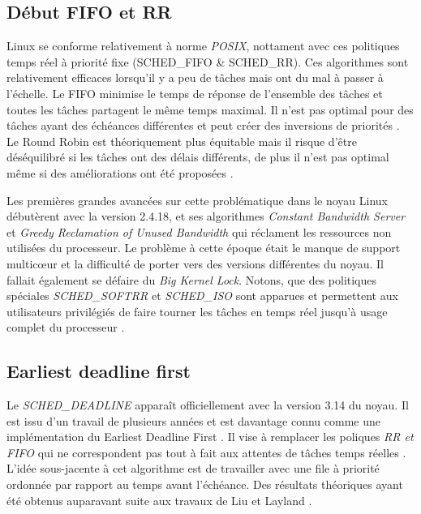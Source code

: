 \documentclass[letterpaper]{article}
\begin{document}
\subsection{Début FIFO et RR}

Linux se conforme relativement à norme \textit{POSIX}, nottament avec ces politiques temps réel à priorité fixe (SCHED\_FIFO \& SCHED\_RR). Ces algorithmes sont relativement efficaces lorsqu'il y a peu de tâches mais ont du mal à passer à l'échelle. Le FIFO minimise le temps de réponse de l'ensemble des tâches et toutes les tâches partagent le même temps maximal. Il n'est pas optimal pour des tâches ayant des échéances différentes et peut créer des inversions de priorités \citep{Klein:1993:PHR:174003}. Le Round Robin est théoriquement plus équitable mais il risque d'être déséquilibré si les tâches ont des délais différents, de plus il n'est pas optimal même si des améliorations ont été proposées \citep{Shreedhar:1995:EFQ:217391.217453}.

Les premières grandes avancées sur cette problématique dans le noyau Linux débutèrent avec la version 2.4.18, et ses algorithmes \textit{Constant Bandwidth Server} \citep{Abeni:1998:IMA:827270.829047} et \textit{Greedy Reclamation of Unused Bandwidth} \citep{Lipari:2000:GRU:1947412.1947445} qui réclament les ressources non utilisées du processeur. Le problème à cette époque était le manque de support multicœur et la difficulté de porter vers des versions différentes du noyau. Il fallait également se défaire du \textit{Big Kernel Lock}. Notons, que des politiques spéciales \textit{SCHED\_SOFTRR} et \textit{SCHED\_ISO} sont apparues et permettent aux utilisateurs privilégiés de faire tourner les tâches en temps réel jusqu'à usage complet du processeur \citep{scordino2006linux}.

\subsection{Earliest deadline first}

Le \textit{SCHED\_DEADLINE} apparaît officiellement avec la version 3.14 du noyau. Il est issu d'un travail de plusieurs années et est davantage connu comme une implémentation du Earliest Deadline First \citep{faggioli2009edf}. Il vise à remplacer les poliques \textit{RR et FIFO} qui ne correspondent pas tout à fait aux attentes de tâches temps réelles \citep{buttazzo2011hard}. L'idée sous-jacente à cet algorithme est de travailler avec une file à priorité ordonnée par rapport au temps avant l'échéance. Des résultats théoriques ayant été obtenus auparavant suite aux travaux de Liu et Layland \citep{liu1973scheduling}.
\end{document}
